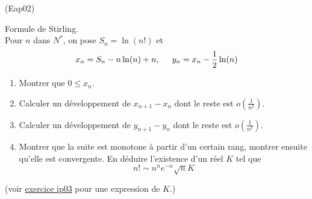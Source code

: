 \begin{tiny}(Eap02)\end{tiny} Formule de Stirling.\\
Pour $n$ dans $N^*$, on pose $S_n= \ln(n!)$ et 
\begin{displaymath}
 x_n=S_n-n\ln(n)+n,\hspace{0.5cm}
y_n = x_n-\frac{1}{2}\ln(n)
\end{displaymath}
\begin{enumerate}
 \item Montrer que $0\leq x_n$.
 \item Calculer un développement de $x_{n+1}-x_n$ dont le reste est $o(\frac{1}{n^2})$.
 \item Calculer un développement de $y_{n+1}-y_n$ dont le reste est $o(\frac{1}{n^2})$.
 \item Montrer que la suite est monotone à partir d'un certain rang, montrer ensuite qu'elle est convergente. En déduire l'existence d'un réel $K$ tel que
\begin{displaymath}
 n! \sim n^ne^{-n}\sqrt{n}K
\end{displaymath}
\end{enumerate}
(voir \href{\baseurl temptex/fexip.pdf}{exercice ip03} pour une expression de $K$.)